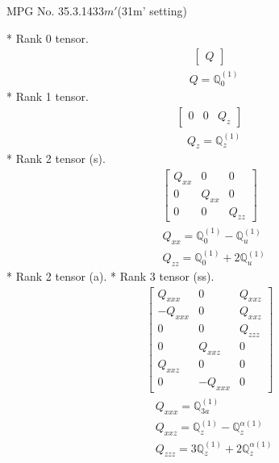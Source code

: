 \documentclass[fleqn,8pt,landscape]{jsarticle}
\begin{document}
\setcounter{MaxMatrixCols}{32}

\renewcommand{\tablename}{Table~}
\renewcommand{\figurename}{Figure~}
\begin{center}
\LARGE
MPG No. 35.3.143\quad$3m'$\quad(31m' setting)
\end{center}
* Rank 0 tensor.
\begin{align*}
\begin{bmatrix} Q \end{bmatrix}
\end{align*}
\begin{align*}
& Q = \mathbb{Q}_{0}^{(1)}
\end{align*}
* Rank 1 tensor.
\begin{align*}
\begin{bmatrix} 0 & 0 & Q_{z} \end{bmatrix}
\end{align*}
\begin{align*}
& Q_{z} = \mathbb{Q}_{z}^{(1)}
\end{align*}
* Rank 2 tensor (s).
\begin{align*}
\begin{bmatrix} Q_{xx} & 0 & 0 \\ 0 & Q_{xx} & 0 \\ 0 & 0 & Q_{zz} \end{bmatrix}
\end{align*}
\begin{align*}
& Q_{xx} = \mathbb{Q}_{0}^{(1)} - \mathbb{Q}_{u}^{(1)} \\
& Q_{zz} = \mathbb{Q}_{0}^{(1)} + 2 \mathbb{Q}_{u}^{(1)}
\end{align*}
* Rank 2 tensor (a).
* Rank 3 tensor (ss).
\begin{align*}
\begin{bmatrix} Q_{xxx} & 0 & Q_{xxz} \\ - Q_{xxx} & 0 & Q_{xxz} \\ 0 & 0 & Q_{zzz} \\ 0 & Q_{xxz} & 0 \\ Q_{xxz} & 0 & 0 \\ 0 & - Q_{xxx} & 0 \end{bmatrix}
\end{align*}
\begin{align*}
& Q_{xxx} = \mathbb{Q}_{3a}^{(1)} \\
& Q_{xxz} = \mathbb{Q}_{z}^{(1)} - \mathbb{Q}_{z}^{\alpha(1)} \\
& Q_{zzz} = 3 \mathbb{Q}_{z}^{(1)} + 2 \mathbb{Q}_{z}^{\alpha(1)}
\end{align*}
\end{document}
